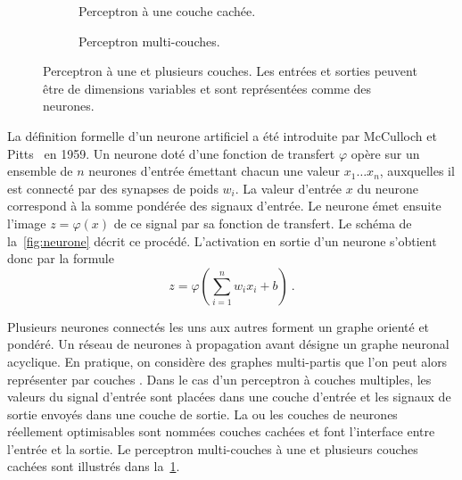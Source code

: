\begin{figure}[t]
  \begin{subfigure}[b]{0.5\textwidth}
    \resizebox{\textwidth}{!}{
    
    }
  \caption{Perceptron à une couche cachée.}
  \end{subfigure}%
  \begin{subfigure}[b]{0.5\textwidth}
    \resizebox{\textwidth}{!}{
    
    }
  \caption{Perceptron multi-couches.}
  \end{subfigure}
  \caption{Perceptron à une et plusieurs couches. Les entrées et sorties peuvent être de dimensions variables et sont représentées comme des neurones.}
  \label{fig:perceptron}
\end{figure}

La définition formelle d'un neurone artificiel a été introduite par McCulloch et Pitts~\cite{lettvin_what_1959} en 1959. Un neurone doté d'une fonction de transfert $\varphi$ opère sur un ensemble de $n$ neurones d'entrée émettant chacun une valeur $x_1\dots{}x_n$, auxquelles il est connecté par des synapses de poids $w_i$. La valeur d'entrée $x$ du neurone correspond à la somme pondérée des signaux d'entrée. Le neurone émet ensuite l'image $z = \varphi(x)$ de ce signal par sa fonction de transfert. Le schéma de la~\cref{fig:neurone} décrit ce procédé. L'activation en sortie d'un neurone s'obtient donc par la formule
$$z = \varphi\left(\sum_{i=1}^n w_i x_i + b\right)~.$$

Plusieurs neurones connectés les uns aux autres forment un graphe orienté et pondéré. Un réseau de neurones à propagation avant désigne un graphe neuronal acyclique. En pratique, on considère des graphes multi-partis que l'on peut alors représenter par \fg couches \og{}. Dans le cas d'un perceptron à couches multiples, les valeurs du signal d'entrée sont placées dans une couche d'entrée et les signaux de sortie envoyés dans une couche de sortie. La ou les couches de neurones réellement optimisables sont nommées \og couches cachées \fg{} et font l'interface entre l'entrée et la sortie. Le perceptron multi-couches à une et plusieurs couches cachées sont illustrés dans la~\cref{fig:perceptron}.

